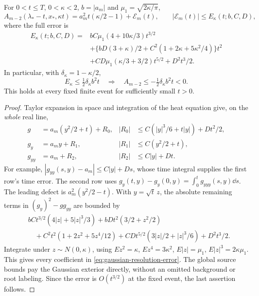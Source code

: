 \begin{theorem}\label{thm:gaussian-resolution}
For \(0<t\le T\), \(0<\kappa<2\), \(b=|a_m|\) and
\(\mu_1=\sqrt{2\kappa/\pi}\),
\begin{equation}\label{eq:gaussian-resolution}
 A_{m-2}(\lambda_*-t,x_*,\kappa t)
       =a_m^2t(\kappa/2-1)+\mathcal E_m(t),
       \qquad |\mathcal E_m(t)|\le E_\kappa(t;b,C,D),
\end{equation}
where the full error is
\begin{align}\label{eq:gaussian-resolution-error}
 E_\kappa(t;b,C,D)={}&bC\mu_1(4+10\kappa/3)t^{3/2}\nonumber\\
 &+\{bD(3+\kappa)/2+C^2(1+2\kappa+5\kappa^2/4)\}t^2\nonumber\\
 &+CD\mu_1(\kappa/3+3/2)t^{5/2}+D^2t^3/2.
\end{align}
In particular, with \(\delta_\kappa=1-\kappa/2\),
\begin{equation}\label{eq:gaussian-resolution-margin}
 E_\kappa\le\tfrac12\delta_\kappa b^2t
 \quad\Longrightarrow\quad A_{m-2}\le-\tfrac12\delta_\kappa b^2t<0.
\end{equation}
This holds at every fixed finite event for sufficiently small \(t>0\).
\end{theorem}
\begin{proof}
Taylor expansion in space and integration of the heat equation give,
on the \emph{whole} real line,
\begin{align*}
 g&=a_m(y^2/2+t)+R_0,&
 |R_0|&\le C(|y|^3/6+t|y|)+Dt^2/2,\\
 g_y&=a_my+R_1,& |R_1|&\le C(y^2/2+t),\\
 g_{yy}&=a_m+R_2,& |R_2|&\le C|y|+Dt.
\end{align*}
For example, \(|g_{yy}(s,y)-a_m|\le C|y|+Ds\), whose time
integral supplies the first row's time error. The second row uses
\(g_y(t,y)-g_y(0,y)=\int_0^tg_{yyy}(s,y)\dd s\).
The leading defect is \(a_m^2(y^2/2-t)\). With \(y=\sqrt t\,z\),
the absolute remaining terms in \((g_y)^2-gg_{yy}\) are bounded by
\begin{align*}
 &bCt^{3/2}(4|z|+5|z|^3/3)+bDt^2(3/2+z^2/2)\\
 &\quad+C^2t^2(1+2z^2+5z^4/12)
       +CDt^{5/2}(3|z|/2+|z|^3/6)+D^2t^3/2.
\end{align*}
Integrate under \(z\sim N(0,\kappa)\), using
\(Ez^2=\kappa\), \(Ez^4=3\kappa^2\),
\(E|z|=\mu_1\), \(E|z|^3=2\kappa\mu_1\).
This gives every coefficient in \eqref{eq:gaussian-resolution-error}.
The global source bounds pay the Gaussian exterior directly, without
an omitted background or root labeling. Since the error is
\(O(t^{3/2})\) at the fixed event, the last assertion follows.
\end{proof}

